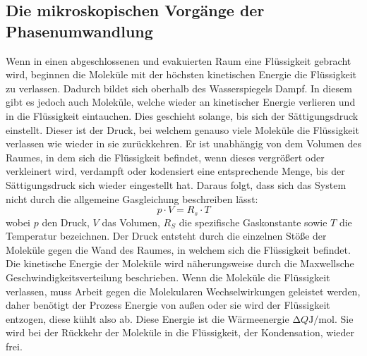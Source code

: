   \subsection{Die mikroskopischen Vorgänge der Phasenumwandlung}
  \label{sec:mikrovorgänge}
  Wenn in einen abgeschlossenen und evakuierten Raum eine Flüssigkeit gebracht wird, beginnen die Moleküle mit der höchsten
  kinetischen Energie die Flüssigkeit zu verlassen. Dadurch bildet sich oberhalb des Wasserspiegels Dampf. In diesem
  gibt es jedoch auch Moleküle, welche wieder an kinetischer Energie verlieren und in die Flüssigkeit eintauchen. Dies geschieht
  solange, bis sich der Sättigungsdruck einstellt. Dieser ist der Druck, bei welchem genauso viele Moleküle die Flüssigkeit
  verlassen wie wieder in sie zurückkehren. Er ist unabhängig von dem Volumen des Raumes, in dem sich die Flüssigkeit befindet,
  wenn dieses vergrößert oder verkleinert wird, verdampft oder kodensiert eine entsprechende Menge, bis der Sättigungsdruck sich
  wieder eingestellt hat. Daraus folgt, dass sich das System nicht durch die allgemeine Gasgleichung beschreiben lässt:
  \begin{equation}
    \label{eqn:gasgleichung}
      p \cdot V = R_{s} \cdot T
  \end{equation}
  wobei $p$ den Druck, $V$ das Volumen, $R_{S}$ die spezifische Gaskonstante sowie $T$ die Temperatur bezeichnen.
  Der Druck entsteht durch die einzelnen Stöße der Moleküle gegen die Wand des Raumes,
  in welchem sich die Flüssigkeit befindet. Die kinetische Energie der Moleküle wird näherungsweise durch die Maxwellsche
  Geschwindigkeitsverteilung beschrieben. Wenn die Moleküle die Flüssigkeit verlassen, muss Arbeit gegen die Molekularen
  Wechselwirkungen geleistet werden, daher benötigt der Prozess Energie von außen oder sie wird der Flüssigkeit entzogen, diese
  kühlt also ab. Diese Energie ist die Wärmeenergie $\increment Q \si{\joule\per\mol}$. Sie wird bei der Rückkehr der Moleküle in
  die Flüssigkeit, der Kondensation, wieder frei.
